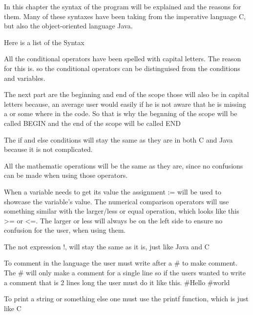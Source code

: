 In this chapter the syntax of the program will be explained and the reasons for them. Many of these syntaxes have been taking from the imperative language C, but also the object-oriented language Java. 

Here is a list of the Syntax %

All the conditional operators have been spelled with capital letters. The reason for this is. so the conditional operators can be distinguised from the conditions and variables.

The next part are the beginning and end of the scope those will also be in capital letters because, an average user would easily if he is not aware that he is missing a { or } some where in the code. So that is why the begnning of the scope will be called BEGIN and the end of the scope will be called END

The if and else conditions will stay the same as they are in both C and Java because it is not complicated.

All the mathematic operations will be the same as they are, since no confusions can be made when using those operators.

When a variable needs to get its value the assignment := will be used to showcase the variable's value. The numerical comparison operators will use something similar with the  larger/less or equal operation, which looks like this >= or <=. The larger or less will always be on the left side to ensure no confusion for the user, when using them.

The not expression !, will stay the same as it is, just like Java and C

To comment in the language the user must write after a # to make comment. The # will only make a comment for a single line so if the users wanted to write a comment that is 2 lines long the user must do it like this.
#Hello
#world

To print a string or something else one must use the printf function, which is just like C